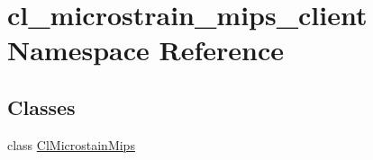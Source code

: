 \hypertarget{namespacecl__microstrain__mips__client}{}\section{cl\+\_\+microstrain\+\_\+mips\+\_\+client Namespace Reference}
\label{namespacecl__microstrain__mips__client}
\subsection*{Classes}
\begin{DoxyCompactItemize}
\item 
class \hyperlink{classcl__microstrain__mips__client_1_1ClMicrostainMips}{Cl\+Microstain\+Mips}
\end{DoxyCompactItemize}
